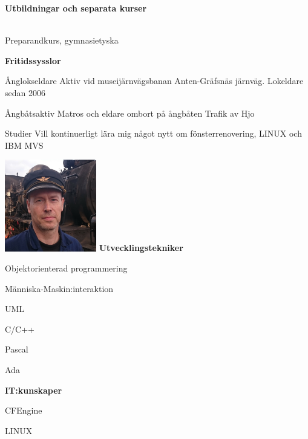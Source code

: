 \documentclass[a4paper,swedish,10pt]{article}
\newenvironment*{descriptioncv}[1]%
{%
  \textbf{\Large #1}%
  \begin{description}[nosep,font=\sffamily\bfseries, leftmargin=0.5cm, style=nextline]%
  }%
  {\end{description}\vspace{0.4cm}}
\newcommand*{\cvitem}[3]{\item[#1]{\cinzel#2}\\#3}
\begin{document}
\begin{minipage}[t]{0.745\textwidth}
\begin{descriptioncv}{Utbildningar och separata kurser}
    \cvitem{Tyska, Högskolan i Skövde}{2007}{Preparandkurs, gymnasietyska}
  \end{descriptioncv}
  \begin{descriptioncv}{Fritidssysslor}
  \item[Ånglokseldare]Aktiv vid museijärnvägsbanan Anten-Gräfsnäs järnväg. Lokeldare sedan 2006
  \item[Ångbåtsaktiv]Matros och eldare ombort på ångbåten Trafik av Hjo
  \item[Studier]Vill kontinuerligt lära mig något nytt om fönsterrenovering, LINUX och IBM MVS
  \end{descriptioncv}
\end{minipage}
\begin{minipage}[t]{0.27\textwidth}
  \raggedleft%
  \vspace{-\topskip}
  \includegraphics[height=4cm]{bild.jpg}
  \textbf{Utvecklingstekniker}
  \begin{description}[nosep]
    \raggedleft\setlength\itemsep{0.1ex}\small%
  \item Objektorienterad programmering
  \item Människa-Maskin:interaktion
  \item UML
  \item C/C++
  \item Pascal
  \item Ada
  \end{description}
  \vspace{0.5cm}
  \textbf{IT:kunskaper}
  \begin{description}[nosep]
    \raggedleft\setlength\itemsep{0.1ex}\small%
  \item CFEngine
  \item LINUX

\end{description}
\end{minipage}
\end{document}
